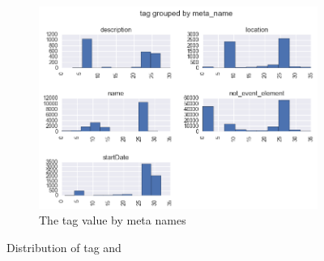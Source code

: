 \begin{figure}[H]
\begin{subfigure}{.5\textwidth}
  \centering
  \includegraphics[width=1\textwidth]{figures07/distrTagByMeta}
  \caption{The tag value by meta names}
  \label{fig:distrTagByMeta}
\end{subfigure}
\begin{subfigure}{.5\textwidth}
  \centering
\end{subfigure}
\caption{Distribution of tag and }
\end{figure}

